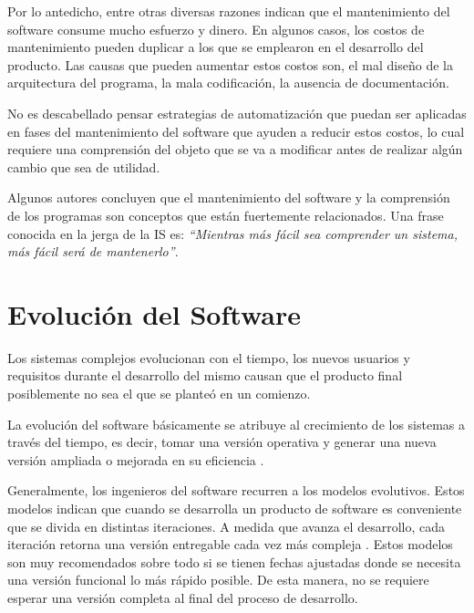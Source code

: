 
Por lo antedicho, entre otras diversas razones \cite{KBVR00} indican que el man\-tenimiento del software consume mucho esfuerzo y dinero. En algunos casos, los costos de mantenimiento pueden duplicar a los que se emplearon en el desarro\-llo del producto. Las causas que pueden aumentar estos costos son, el mal diseño de la arquitectura del programa, la mala codificación, la ausencia de documentación.

No es descabellado pensar estrategias de automatización que puedan ser aplicadas en fases del mantenimiento del software que ayuden a reducir estos costos, lo cual requiere una comprensión del objeto que se va a modificar antes de realizar algún cambio que sea de utilidad.
 
Algunos autores \cite{KBVR00,MAS05,RSPMGH02,PFT02} concluyen que el mantenimiento del software y la comprensión de los programas son conceptos que están fuertemente relacionados. Una frase conocida en la jerga de la IS es: \textit{“Mientras más fácil sea comprender un sistema, más fácil será de mantenerlo”}.


\section{Evolución del Software}

Los sistemas complejos evolucionan con el tiempo, los nuevos usuarios y requisitos durante el desarrollo del mismo causan que el producto final posiblemente no sea el que se planteó en un comienzo. 

La evolución del software básicamente se atribuye al crecimiento de los sistemas a través del tiempo, es decir, tomar una versión operativa y generar una nueva versión ampliada o mejorada en su eficiencia \cite{KBVR00}.

Generalmente, los ingenieros del software recurren a los modelos evolutivos. Estos modelos indican que cuando se desarrolla un producto de software es conveniente que se divida en distintas iteraciones. A medida que avanza el desarrollo, cada iteración retorna una versión entregable cada vez más compleja \cite{RSPMGH02}.
Estos modelos son muy recomendados sobre todo si se tienen fechas ajustadas donde se necesita una versión funcional lo más rápido posible. De esta manera, no se requiere esperar una versión completa al final del proceso de desarrollo.

